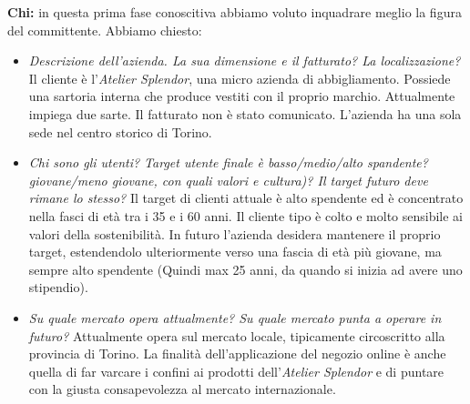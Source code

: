 \documentclass[12pt]{article}
\begin{document}
\textbf{Chi:} in questa prima fase conoscitiva abbiamo voluto inquadrare meglio la figura del committente. Abbiamo chiesto:
\begin{itemize}
    \item {\em Descrizione dell'azienda. La sua dimensione e il fatturato? La localizzazione?} Il cliente è l'{\em Atelier Splendor}, una micro azienda di abbigliamento. Possiede una sartoria interna che produce vestiti con il proprio marchio. Attualmente impiega due sarte. Il fatturato non è stato comunicato. L'azienda ha una sola sede nel centro storico di Torino.
    \item {\em Chi sono gli utenti? Target utente finale è basso/medio/alto spandente? giovane/meno giovane, con quali valori e cultura)? Il target futuro deve rimane lo stesso?} Il target di clienti attuale è alto spendente ed è concentrato nella fasci di età tra i 35 e i 60 anni. Il cliente tipo è colto e molto sensibile ai valori della sostenibilità. In futuro l'azienda desidera mantenere il proprio target, estendendolo ulteriormente verso una fascia di età più giovane, ma sempre alto spendente (Quindi max 25 anni, da quando si inizia ad avere uno stipendio).  
    \item {\em Su quale mercato opera attualmente? Su quale mercato punta a operare in futuro?} Attualmente opera sul mercato locale, tipicamente circoscritto alla provincia di Torino. La finalità dell'applicazione del negozio online è anche quella di far varcare i confini ai prodotti dell'{\em Atelier Splendor} e di puntare con la giusta consapevolezza al mercato internazionale.
\end{itemize}
\end{document}

